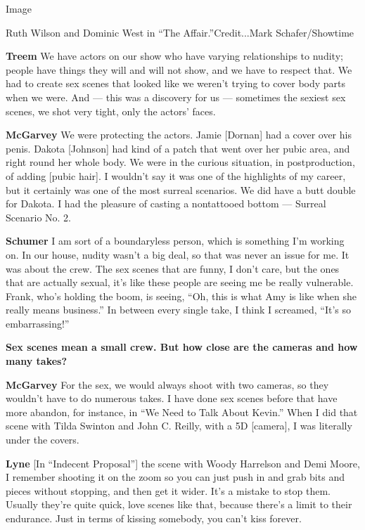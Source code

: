 Image

Ruth Wilson and Dominic West in ``The Affair.''Credit...Mark
Schafer/Showtime

\textbf{Treem} We have actors on our show who have varying relationships
to nudity; people have things they will and will not show, and we have
to respect that. We had to create sex scenes that looked like we weren't
trying to cover body parts when we were. And --- this was a discovery
for us --- sometimes the sexiest sex scenes, we shot very tight, only
the actors' faces.

\textbf{McGarvey} We were protecting the actors. Jamie {[}Dornan{]} had
a cover over his penis. Dakota {[}Johnson{]} had kind of a patch that
went over her pubic area, and right round her whole body. We were in the
curious situation, in postproduction, of adding {[}pubic hair{]}. I
wouldn't say it was one of the highlights of my career, but it certainly
was one of the most surreal scenarios. We did have a butt double for
Dakota. I had the pleasure of casting a nontattooed bottom --- Surreal
Scenario No. 2.

\textbf{Schumer} I am sort of a boundaryless person, which is something
I'm working on. In our house, nudity wasn't a big deal, so that was
never an issue for me. It was about the crew. The sex scenes that are
funny, I don't care, but the ones that are actually sexual, it's like
these people are seeing me be really vulnerable. Frank, who's holding
the boom, is seeing, ``Oh, this is what Amy is like when she really
means business.'' In between every single take, I think I screamed,
``It's so embarrassing!''

\textbf{Sex scenes mean a small crew. But how close are the cameras and
how many takes?}

\textbf{McGarvey} For the sex, we would always shoot with two cameras,
so they wouldn't have to do numerous takes. I have done sex scenes
before that have more abandon, for instance, in ``We Need to Talk About
Kevin.'' When I did that scene with Tilda Swinton and John C. Reilly,
with a 5D {[}camera{]}, I was literally under the covers.

\textbf{Lyne} {[}In ``Indecent Proposal''{]} the scene with Woody
Harrelson and Demi Moore, I remember shooting it on the zoom so you can
just push in and grab bits and pieces without stopping, and then get it
wider. It's a mistake to stop them. Usually they're quite quick, love
scenes like that, because there's a limit to their endurance. Just in
terms of kissing somebody, you can't kiss forever.

